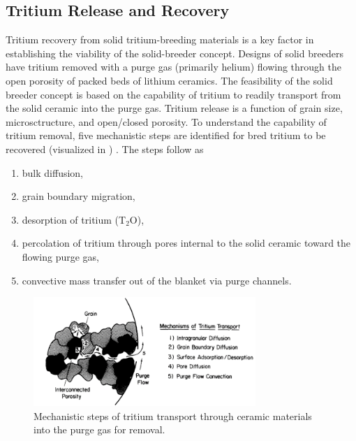\documentclass[11pt]{report} %
\begin{document}

\subsection{Tritium Release and Recovery}
Tritium recovery from solid tritium-breeding materials is a key factor in establishing the viability of the solid-breeder concept. Designs of solid breeders have tritium removed with a purge gas (primarily helium) flowing through the open porosity of packed beds of lithium ceramics. The feasibility of the solid breeder concept is based on the capability of tritium to readily transport from the solid ceramic into the purge gas. Tritium release is a function of grain size, microsctructure, and open/closed porosity. To understand the capability of tritium removal, five mechanistic steps are identified for bred tritium to be recovered (visualized in ) . The steps follow as
\begin{enumerate}
\item bulk diffusion,
\item grain boundary migration,
\item desorption of tritium (T$_2$O),
\item percolation of tritium through pores internal to the solid ceramic toward the flowing purge gas,
\item convective mass transfer out of the blanket via purge channels.
\end{enumerate}

\begin{figure}[ht]
	\centering
	\includegraphics[width=0.75\textwidth]{images/mechanisms_tritium_transport} 
	\caption{Mechanistic steps of tritium transport through ceramic materials into the purge gas for removal.}
	\label{fig:mechanisms_tritium_transport}
\end{figure}
\end{document}
